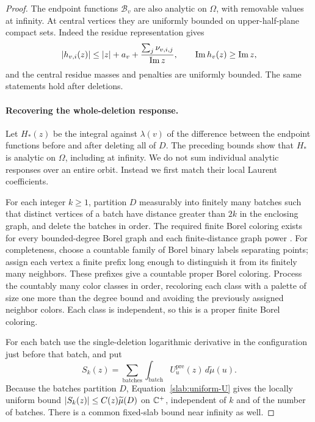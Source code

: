\begin{proof}
The endpoint functions $\mathcal B_v$ are also analytic on $\Omega$,
with removable values at infinity. At central vertices they are
uniformly bounded on upper-half-plane compact sets. Indeed the
residue representation gives
\[
 \left|h_{v,i}(z)\right|\leq\left|z\right|+a_v+
       \frac{\sum_j\nu_{v,i,j}}{\operatorname{Im}z},
 \qquad \operatorname{Im}h_v(z)\geq\operatorname{Im}z,
\]
and the central residue masses and penalties are uniformly bounded.
The same statements hold after deletions.

\paragraph{Recovering the whole-deletion response.}
Let $H_*(z)$ be the integral against $\lambda(v)$ of the difference
between the endpoint functions before and after deleting all of $D$.
The preceding bounds show that $H_*$ is analytic on $\Omega$, including
at infinity. We do not sum individual analytic responses over an
entire orbit. Instead we first match their local Laurent coefficients.

For each integer $k\geq1$, partition $D$ measurably into finitely many
batches such that distinct vertices of a batch have distance greater
than $2k$ in the enclosing graph, and delete the batches in order.
The required finite Borel coloring exists for every bounded-degree
Borel graph and each finite-distance graph power \cite{KST99}. For completeness,
choose a countable family of Borel binary labels separating points;
assign each vertex a finite prefix long enough to distinguish it from
its finitely many neighbors. These prefixes give a countable proper
Borel coloring. Process the countably many color classes in order,
recoloring each class with a palette of size one more than the degree
bound and avoiding the previously assigned neighbor colors. Each
class is independent, so this is a proper finite Borel coloring.

For each batch use the single-deletion logarithmic derivative in the
configuration just before that batch, and put
\[
 S_k(z)=\sum_{\mathrm{batches}}\int_{\mathrm{batch}}
 U_u^{\mathrm{pre}}(z)\,d\widetilde\mu(u).
\]
Because the batches partition $D$, Equation~\eqref{slab:uniform-U}
gives the locally uniform bound
$\left|S_k(z)\right|\leq C(z)\widetilde\mu(D)$ on $\mathbb C^+$, independent of
$k$ and of the number of batches. There is a common fixed-slab bound
near infinity as well.


\end{proof}
